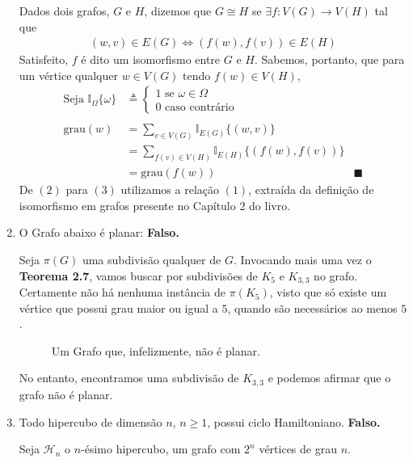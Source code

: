 \documentclass{homework}
\newcommand{\cqd}{%
	\ensuremath{\blacksquare}
}
\begin{document}
\begin{enumerate}[label=\textbf{\arabic*)}]
	Dados dois grafos, $G$ e $H$, dizemos que $G \cong H$ se $\exists f : V(G) \to V(H)$ tal que
		\begin{align}
			(w, v) \in E(G) \iff (f(w), f(v)) \in E(H)
		\end{align}
	Satisfeito, $f$ é dito um isomorfismo entre $G$ e $H$. Sabemos, portanto, que para um vértice qualquer $w \in V(G)$ tendo $f(w) \in V(H)$,
		\begin{align}
		\text{Seja } \mathbb{I}_{\Omega}\{\omega\} &\triangleq \begin{cases}
		1 \text{ se } \omega \in \Omega\\
		0 \text{ caso contrário}
		\end{cases} \nonumber \\
		~ \nonumber \\
		\text{grau}(w) &= \sum_{v \in V(G)} \mathbb{I}_{E(G)}\{(w, v)\}\\
					   &= \sum_{f(v) \in V(H)} \mathbb{I}_{E(H)}\{(f(w), f(v))\}\\
					   &= \text{grau}(f(w)) & \cqd \nonumber
		\end{align}
	De $(2)$ para $(3)$ utilizamos a relação $(1)$, extraída da definição de isomorfismo em grafos presente no Capítulo 2 do livro\cite{jayme:18}.
	
	\item O Grafo abaixo é planar: \textbf{Falso.} \par
	
	Seja $\pi(G)$ uma subdivisão qualquer de $G$. Invocando mais uma vez o \textbf{Teorema 2.7}\cite{jayme:18}, vamos buscar por subdivisões de $K_5$ e $K_{3, 3}$ no grafo. Certamente não há nenhuma instância de $\pi(K_5)$, visto que só existe um vértice que possui grau maior ou igual a $5$, quando são necessários ao menos $5$.
	
	\begin{figure}[H]
		\centering
		
		\caption{Um Grafo que, infelizmente, não é planar.}
		\label{fig:1.5.1}
	\end{figure}
	
	No entanto, encontramos uma subdivisão de $K_{3, 3}$ e podemos afirmar que o grafo não é planar.
	
	\item Todo hipercubo de dimensão $n$, $n \ge 1$, possui ciclo Hamiltoniano. \textbf{Falso.}
	
	Seja $\mathscr{H}_n$ o $n$-ésimo hipercubo, um grafo com $2^n$ vértices de grau $n$. \par
	

\end{enumerate}
\end{document}
